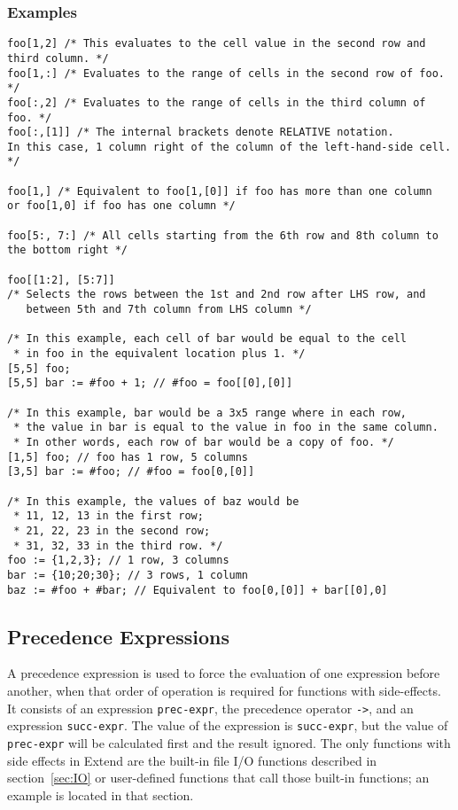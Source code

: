 \subsubsection{Examples}
\begin{lstlisting}
foo[1,2] /* This evaluates to the cell value in the second row and third column. */
foo[1,:] /* Evaluates to the range of cells in the second row of foo. */
foo[:,2] /* Evaluates to the range of cells in the third column of foo. */
foo[:,[1]] /* The internal brackets denote RELATIVE notation.
In this case, 1 column right of the column of the left-hand-side cell. */

foo[1,] /* Equivalent to foo[1,[0]] if foo has more than one column
or foo[1,0] if foo has one column */

foo[5:, 7:] /* All cells starting from the 6th row and 8th column to the bottom right */

foo[[1:2], [5:7]]
/* Selects the rows between the 1st and 2nd row after LHS row, and
   between 5th and 7th column from LHS column */

/* In this example, each cell of bar would be equal to the cell
 * in foo in the equivalent location plus 1. */
[5,5] foo;
[5,5] bar := #foo + 1; // #foo = foo[[0],[0]]

/* In this example, bar would be a 3x5 range where in each row,
 * the value in bar is equal to the value in foo in the same column.
 * In other words, each row of bar would be a copy of foo. */
[1,5] foo; // foo has 1 row, 5 columns
[3,5] bar := #foo; // #foo = foo[0,[0]]

/* In this example, the values of baz would be
 * 11, 12, 13 in the first row;
 * 21, 22, 23 in the second row;
 * 31, 32, 33 in the third row. */
foo := {1,2,3}; // 1 row, 3 columns
bar := {10;20;30}; // 3 rows, 1 column
baz := #foo + #bar; // Equivalent to foo[0,[0]] + bar[[0],0]

\end{lstlisting}
\subsection{Precedence Expressions}
A precedence expression is used to force the evaluation of one expression before another, when that order of operation is required for functions with side-effects. It consists of an expression \texttt{prec-expr}, the precedence operator \texttt{->}, and an expression \texttt{succ-expr}. The value of the expression is \texttt{succ-expr}, but the value of \texttt{prec-expr} will be calculated first and the result ignored. The only functions with side effects in Extend are the built-in file I/O functions described in section~\ref{sec:IO} or user-defined functions that call those built-in functions; an example is located in that section.
